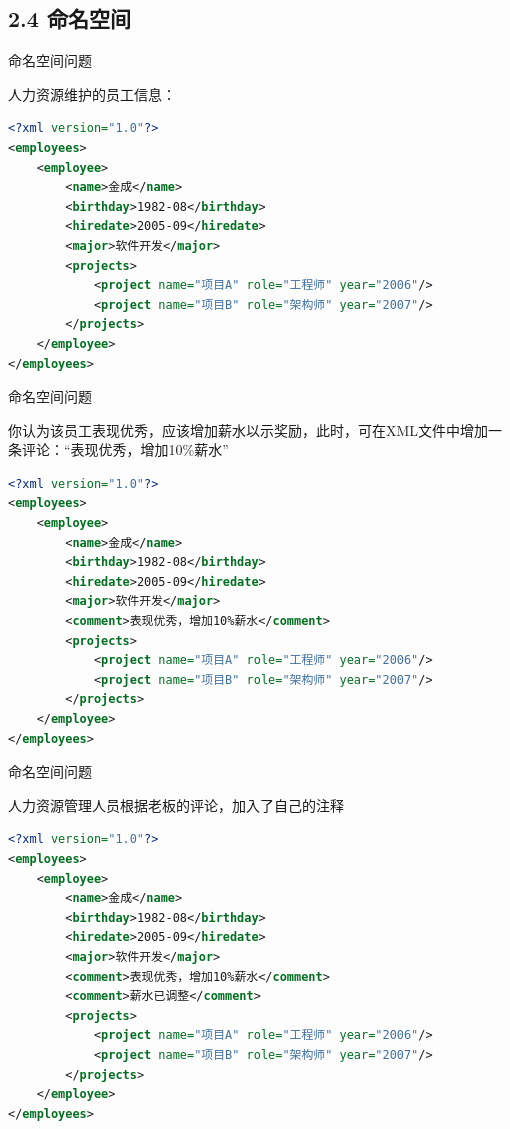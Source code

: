 \subsection{2.4 命名空间}

\begin{frame}[fragile]{命名空间问题}
\par 人力资源维护的员工信息：
\begin{lstlisting}[tabsize=8, basicstyle=\small\tt, language=XML]
<?xml version="1.0"?>
<employees>
    <employee>
        <name>金成</name>
        <birthday>1982-08</birthday>
        <hiredate>2005-09</hiredate>
        <major>软件开发</major>
        <projects>
            <project name="项目A" role="工程师" year="2006"/>
            <project name="项目B" role="架构师" year="2007"/>
        </projects>
    </employee>
</employees>
\end{lstlisting}
\end{frame}


\begin{frame}[fragile]{命名空间问题}
\par 你认为该员工表现优秀，应该增加薪水以示奖励，此时，可在XML文件中增加一条评论：“表现优秀，增加10\%薪水”
\begin{lstlisting}[tabsize=8, basicstyle=\small\tt, language=XML]
<?xml version="1.0"?>
<employees>
    <employee>
        <name>金成</name>
        <birthday>1982-08</birthday>
        <hiredate>2005-09</hiredate>
        <major>软件开发</major>
        <comment>表现优秀，增加10%薪水</comment>
        <projects>
            <project name="项目A" role="工程师" year="2006"/>
            <project name="项目B" role="架构师" year="2007"/>
        </projects>
    </employee>
</employees>
\end{lstlisting}
\end{frame}


\begin{frame}[fragile]{命名空间问题}
\par 人力资源管理人员根据老板的评论，加入了自己的注释
\begin{lstlisting}[tabsize=8, basicstyle=\small\tt, language=XML]
<?xml version="1.0"?>
<employees>
    <employee>
        <name>金成</name>
        <birthday>1982-08</birthday>
        <hiredate>2005-09</hiredate>
        <major>软件开发</major>
        <comment>表现优秀，增加10%薪水</comment>
        <comment>薪水已调整</comment>
        <projects>
            <project name="项目A" role="工程师" year="2006"/>
            <project name="项目B" role="架构师" year="2007"/>
        </projects>
    </employee>
</employees>
\end{lstlisting}
\end{frame}


